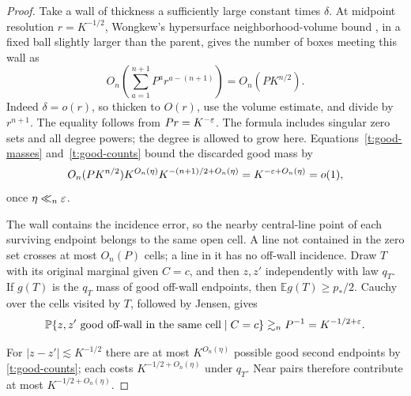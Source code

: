 \begin{proof}
Take a wall of thickness a sufficiently large constant times $\delta$.
At midpoint resolution $r=K^{-1/2}$, Wongkew's hypersurface
neighborhood-volume bound \citep[Main Theorem]{Wongkew1993}, in a fixed
ball slightly larger than the parent, gives the number of boxes meeting
this wall as
\begin{equation}\label{t:wall-count}
 O_n\left(\sum_{a=1}^{n+1}P^a r^{a-(n+1)}\right)
       =O_n(PK^{n/2}).
\end{equation}
Indeed $\delta=o(r)$, so thicken to $O(r)$, use the volume estimate,
and divide by $r^{n+1}$.  The equality follows from $Pr=K^{-\varepsilon}$.
The formula includes singular zero sets and all degree powers; the
degree is allowed to grow here.  Equations~\eqref{t:good-masses}
and~\eqref{t:good-counts} bound the discarded good mass by
\begin{equation}\label{t:wall-mass}
 O_n(PK^{n/2})K^{O_n(\eta)}K^{-(n+1)/2+O_n(\eta)}
       =K^{-\varepsilon+O_n(\eta)}=o(1),
\end{equation}
once $\eta\ll_n\varepsilon$.

The wall contains the incidence error, so the nearby central-line point
of each surviving endpoint belongs to the same open cell.  A line not
contained in the zero set crosses at most $O_n(P)$ cells; a line in it
has no off-wall incidence.  Draw $T$ with its original marginal given
$C=c$, and then $z,z'$ independently with law $q_T$.  If $g(T)$ is
the $q_T$ mass of good off-wall endpoints, then
$\mathbb E g(T)\ge p_*/2$.  Cauchy over the cells visited by $T$,
followed by Jensen, gives
\begin{equation}\label{t:pair-lower}
 \mathbb P\{z,z'\text{ good off-wall in the same cell}\mid C=c\}
       \gtrsim_n P^{-1}=K^{-1/2+\varepsilon}.
\end{equation}

For $|z-z'|\lesssim K^{-1/2}$ there are at most $K^{O_n(\eta)}$
possible good second endpoints by \eqref{t:good-counts}; each costs
$K^{-1/2+O_n(\eta)}$ under $q_T$.  Near pairs therefore contribute
at most $K^{-1/2+O_n(\eta)}$.


\end{proof}
